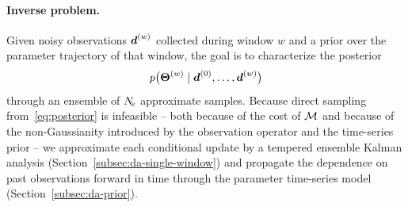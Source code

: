 \paragraph{Inverse problem.}
Given noisy observations $\boldsymbol{d}^{(w)}$ collected during window $w$
and a prior over the parameter trajectory of that window, the goal
is to characterize the posterior
\begin{equation}
  p\bigl(\boldsymbol{\Theta}^{(w)} \mid \boldsymbol{d}^{(0)}, \ldots, \boldsymbol{d}^{(w)}\bigr)
  \label{eq:posterior}
\end{equation}
through an ensemble of $N_{\!e}$ approximate samples.  Because direct
sampling from~\eqref{eq:posterior} is infeasible -- both because of
the cost of $\mathcal{M}$ and because of the non-Gaussianity introduced by
the observation operator and the time-series prior -- we approximate
each conditional update by a tempered ensemble Kalman analysis
(Section~\ref{subsec:da-single-window}) and propagate the dependence
on past observations forward in time through the parameter
time-series model (Section~\ref{subsec:da-prior}).
